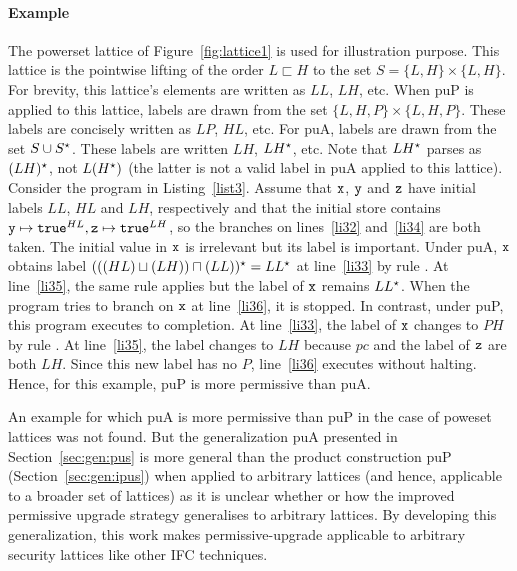 \paragraph{Example}
The powerset lattice of Figure~\ref{fig:lattice1} is used for
illustration purpose. This lattice is the pointwise lifting of the order $L
\sqsubset H$ to the set $S = \{L, H\} \times \{L, H\}$. For brevity,
this lattice's elements are written as $LL$, $LH$, etc. When puP is
applied to this lattice, labels are drawn from the set $\{L, H, P\}
\times \{L, H, P\}$. These labels are concisely written as $LP$, $HL$,
etc. For puA, labels are drawn from the set $S \cup S{}^\star$. These
labels are written $LH$, $LH{}^\star$, etc. Note that $LH{}^\star$ parses as
$(LH){}^\star$, not $L(H{}^\star)$ (the latter is not a valid label in puA
applied to this lattice).
%
Consider the program in Listing~\ref{list3}. Assume that $\texttt{x}$,
$\texttt{y}$ and $\texttt{z}$ have 
initial labels $LL$, $HL$ and $LH$, respectively and that the initial
store contains $\texttt{y} \mapsto \texttt{true}^{HL}, \texttt{z} \mapsto
\texttt{true}^{LH}$, so the branches on lines~\ref{li32}
and~\ref{li34} are both taken. The initial value in $\texttt{x}$ is irrelevant
but its label is important.
Under puA, $\texttt{x}$ obtains label $(((HL) \sqcup (LH)) \sqcap (LL)){}^\star = LL{}^\star$ at
line~\ref{li33} by rule . At line~\ref{li35}, the same rule
applies but the label of $\texttt{x}$ remains $LL{}^\star$. When the program tries
to branch on $\texttt{x}$ at line~\ref{li36}, it is stopped.
In contrast, under puP, this program executes to completion. At
line~\ref{li33}, the label of $\texttt{x}$ changes to $PH$ by rule
. At line~\ref{li35}, the label changes to $LH$ because $pc$
and the label of $\texttt{z}$ are both $LH$. Since this new label has no $P$,
line~\ref{li36} executes without halting.
Hence, for this example, puP is more permissive than puA.

An example for which  puA is more permissive than puP in the case of
poweset lattices was not found. But the generalization puA presented in
Section~\ref{sec:gen:pus} is more general than the product
construction puP (Section~\ref{sec:gen:ipus}) when applied to arbitrary
lattices (and hence, applicable to a broader set of lattices) as it is
unclear whether or how  the improved permissive 
upgrade strategy generalises to arbitrary lattices. By developing this
generalization, this work makes permissive-upgrade applicable to
arbitrary security lattices like other IFC techniques.

